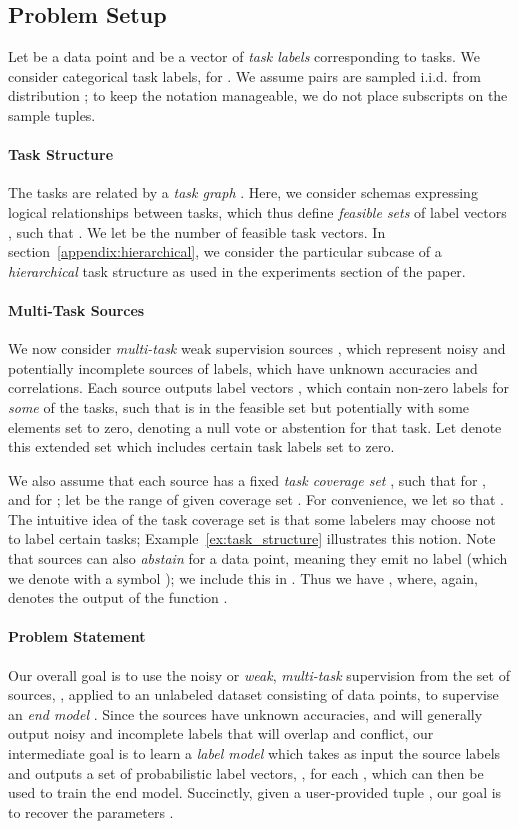 \documentclass[letterpaper]{article}
\begin{document}
\begin{appendix}
\subsection{Problem Setup}
\label{appendix:problem-setup}
Let  be a data point and  be a vector of \textit{task labels} corresponding to  tasks.
We consider categorical task labels,  for .
We assume  pairs are sampled i.i.d. from distribution ; to keep the notation manageable, we do not place subscripts on the sample tuples.

\paragraph*{Task Structure}
The tasks are related by a \emph{task graph} .
Here, we consider schemas expressing logical relationships between tasks, which thus define \textit{feasible sets} of label vectors , such that .
We let  be the number of feasible task vectors.
In section~\ref{appendix:hierarchical}, we consider the particular subcase of a \textit{hierarchical} task structure as used in the experiments section of the paper.
\paragraph*{Multi-Task Sources}
We now consider \textit{multi-task} weak supervision sources , which represent noisy and potentially incomplete sources of labels, which have unknown accuracies and correlations.
Each source  outputs label vectors , which contain non-zero labels for \textit{some} of the tasks, such that  is in the feasible set  but potentially with some elements set to zero, denoting a null vote or abstention for that task.
Let  denote this extended set which includes certain task labels set to zero.

We also assume that each source has a fixed \textit{task coverage set} , such that  for , and  for ; let  be the range of  given coverage set .
For convenience, we let  so that .
The intuitive idea of the task coverage set is that some labelers may choose not to label certain tasks; Example~\ref{ex:task_structure} illustrates this notion.
Note that sources can also \textit{abstain} for a data point, meaning they emit no label (which we denote with a symbol ); we include this in .
Thus we have , where, again,  denotes the output of the function .


\paragraph*{Problem Statement}
Our overall goal is to use the noisy or \textit{weak}, \textit{multi-task} supervision from the set of  sources, , applied to an unlabeled dataset  consisting of  data points, to supervise an \textit{end model} .
Since the sources have unknown accuracies, and will generally output noisy and incomplete labels that will overlap and conflict, our intermediate goal is to learn a \textit{label model}  which takes as input the source labels and outputs a set of probabilistic label vectors, , for each , which can then be used to train the end model.
Succinctly, given a user-provided tuple , our goal is to recover the parameters .


\end{appendix}
\end{document}
